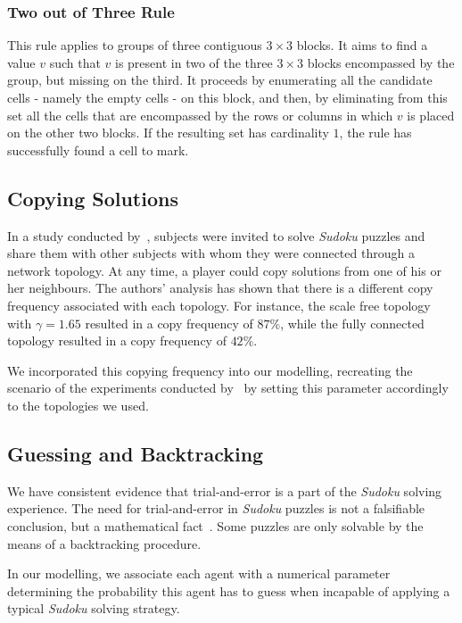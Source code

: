 \documentclass{article}
\begin{document}
\subsubsection{Two out of Three Rule}

This rule applies to groups of three contiguous $3 \times 3$ blocks. It aims to find a value $v$ such that $v$ is present in two of the three $3 \times 3$ blocks encompassed by the group, but missing on the third. It proceeds by enumerating all the candidate cells - namely the empty cells - on this block, and then, by eliminating from this set all the cells that are encompassed by the rows or columns in which $v$ is placed on the other two blocks. If the resulting set has cardinality $1$, the rule has successfully found a cell to mark.

\subsection{Copying Solutions}

In a study conducted by~\cite{farenzena:collabem}, subjects were invited to solve {\em Sudoku} puzzles and share them with other subjects with whom they were connected through a network topology. At any time, a player could copy solutions from one of his or her neighbours. The authors' analysis has shown that there is a different copy frequency associated with each topology. For instance, the scale free topology with $\gamma = 1.65$ resulted in a copy frequency of $87 \%$, while the fully connected topology resulted in a copy frequency of $42 \%$.

We incorporated this copying frequency into our modelling, recreating the scenario of the experiments conducted by~\cite{farenzena:collabem} by setting this parameter accordingly to the topologies we used.

\subsection{Guessing and Backtracking}

We have consistent evidence that trial-and-error is a part of the {\em Sudoku} solving experience. The need for trial-and-error in {\em Sudoku} puzzles is not a falsifiable conclusion, but a mathematical fact~\cite{davis:mathsudoku}. Some puzzles are only solvable by the means of a backtracking procedure.

In our modelling, we associate each agent with a numerical parameter determining the probability this agent has to guess when incapable of applying a typical {\em Sudoku} solving strategy.
\end{document}

